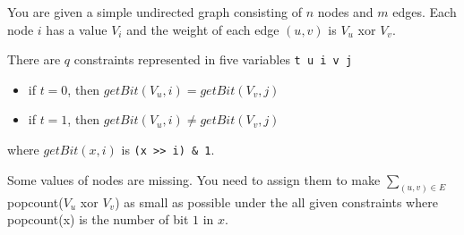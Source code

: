 You are given a simple undirected graph consisting of $n$ nodes and $m$ edges. 
Each node $i$ has a value $V_i$ and the weight of each edge $(u, v)$ is $V_u$ 
xor $V_v$.

There are $q$ constraints represented in five variables \verb+t u i v j+
\begin{itemize}
\item if $t = 0$, then $getBit(V_u, i) = getBit(V_v, j)$
\item if $t = 1$, then $getBit(V_u, i) \neq getBit(V_v, j)$
\end{itemize}
where $getBit(x, i)$ is \verb+(x >> i) & 1+.

Some values of nodes are missing. You need to assign them to make 
$\sum_{(u,v) \in E}$ popcount($V_u$ xor $V_v$) as small as possible 
under the all given constraints where popcount(x) is the number of 
bit $1$ in $x$.
